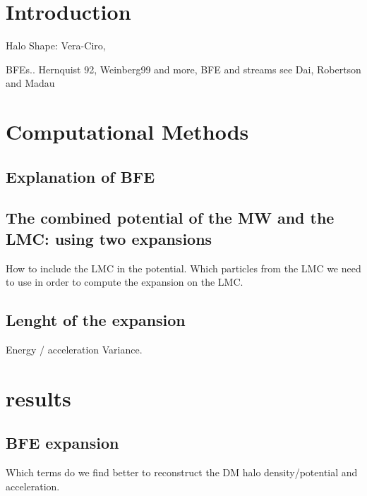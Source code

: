 \documentclass[twocolumn]{aastex62}
\begin{document}
\section{Introduction}

Halo Shape: Vera-Ciro, 

BFEs.. Hernquist 92, Weinberg99 and more, 
BFE and streams see Dai, Robertson and Madau

\section{Computational Methods}

\subsection{Explanation of BFE}


\subsection{The combined potential of the MW and the LMC: using two expansions}

How to include the LMC in the potential. Which particles from the LMC we need to
use in order to compute the expansion on the LMC.

\subsection{Lenght of the expansion}

Energy / acceleration
Variance.




\section{results}

\subsection{BFE expansion}
Which terms do we find better to reconstruct the DM halo density/potential and
acceleration.
\end{document}
